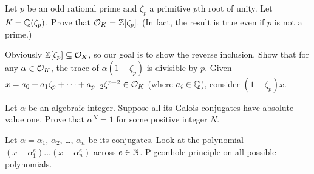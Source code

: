 \begin{dproblem}
	\yod
	\label{prob:ring_int_cyclotomic}
	Let $p$ be an odd rational prime and $\zeta_p$ a primitive $p$th root of unity.
	Let $K = \mathbb Q(\zeta_p)$.
	Prove that $\mathcal O_K = \mathbb Z[\zeta_p]$.
	(In fact, the result is true even if $p$ is not a prime.)
	\begin{hint}
		Obviously $\mathbb Z[\zeta_p] \subseteq \mathcal O_K$, so our goal is to show the reverse inclusion.
		Show that for any $\alpha \in \mathcal O_K$, the trace of $\alpha(1-\zeta_p)$ is divisible by $p$.
		Given $x = a_0 + a_1\zeta_p + \dots + a_{p-2}\zeta^{p-2} \in \mathcal O_K$ (where $a_i \in \mathbb Q$),
		consider $(1-\zeta_p)x$.
	\end{hint}
\end{dproblem}

\begin{problem}
	\yod
	Let $\alpha$ be an algebraic integer.
	Suppose all its Galois conjugates have absolute value one.
	Prove that $\alpha^N=1$ for some positive integer $N$.
	\begin{hint}
		Let $\alpha = \alpha_1$, $\alpha_2$, \dots, $\alpha_n$ be its conjugates.
		Look at the polynomial $(x-\alpha_1^e) \dots (x-\alpha_n^e)$ across $e \in \mathbb N$.
		Pigeonhole principle on all possible polynomials.
	\end{hint}
\end{problem}

